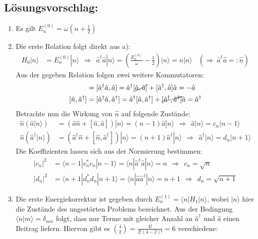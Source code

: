 \documentclass[a4paper,12pt]{article}
\newcommand{\brak}{}
\newcommand{\braket}{}
\newcommand{\kla}{}
\newcommand{\Ket}{}
\begin{document}
\subsection*{Lösungsvorschlag:}
\begin{enumerate}
\item[a)] Es gilt $E_n^{(0)}=\omega\kla\left( {n+\frac{1}{2}} \right)$
\item[b)] Die erste Relation folgt direkt aus a):
\begin{align*}
H_0\Ket | {n} \rangle&=E_n^{(0)}\Ket | {n} \rangle\ \ \Rightarrow\ \ \hat{a}^\dagger\hat{a}\Ket | {n} \rangle=\kla\left( {\frac{E_n^{(0)}}{\omega}-\frac{1}{2}} \right)\Ket | {n} \rangle=n\Ket | {n} \rangle\ \ \ \ \kla\left( {\Rightarrow\ \hat{a}^\dagger\hat{a}=:\hat{n}} \right)
\end{align*}
Aus der gegeben Relation folgen zwei weitere Kommutatoren:
\begin{align*}
[\hat{n},\hat{a}]&=[\hat{a}^\dagger\hat{a},\hat{a}]=\hat{a}^\dagger [\cancel{\hat{a},\hat{a}]}+[\hat{a}^\dagger,\hat{a}]\hat{a}=-\hat{a}\\
[\hat{n},\hat{a}^\dagger]&=[\hat{a}^\dagger\hat{a},\hat{a}^\dagger]=\hat{a}^\dagger[\hat{a},\hat{a}^\dagger]+\cancel{[\hat{a}^\dagger,\hat{a}^\dagger]}\hat{a}=\hat{a}^\dagger
\end{align*}
Betrachte nun die Wirkung von $\hat{n}$ auf folgende Zustände:
\begin{align*}
\hat{n}\kla\left( {\hat{a}\Ket | {n} \rangle} \right)&=\kla\left( {\hat{a}\hat{n}+[\hat{n},\hat{a}]} \right)\Ket | {n} \rangle=(n-1)\hat{a}\Ket | {n} \rangle\ \ \Rightarrow\ \ \hat{a}\Ket | {n} \rangle=c_n\Ket | {n-1} \rangle\\
\hat{n}\kla\left( {\hat{a}^\dagger\Ket | {n} \rangle} \right)&=\kla\left( {\hat{a}^\dagger\hat{n}+[\hat{n},\hat{a}^\dagger]} \right)\Ket | {n} \rangle=(n+1)\hat{a}^\dagger\Ket | {n} \rangle\ \ \Rightarrow\ \ \hat{a}^\dagger\Ket | {n} \rangle=d_n\Ket | {n+1} \rangle
\end{align*}
Die Koeffizienten lassen sich aus der Normierung bestimmen:
\begin{align*}
|c_n|^2&=\brak\langle {n-1}| {c_n^\ast c_n}|n-1\rangle=\braket\langle {n} | {\hat{a}^\dagger\hat{a}} | {n}\rangle=n\ \ \Rightarrow\ \ c_n=\sqrt{n}\\
|d_n|^2&=\brak\langle {n+1}| {d_n^\ast d_n}|n+1\rangle=\braket\langle {n} | {\hat{a}\hat{a}^\dagger} | {n}\rangle=n+1\ \ \Rightarrow\ \ d_n=\sqrt{n+1}
\end{align*}
\item[c)] Die erste Energiekorrektur ist gegeben durch $E_n^{(1)}=\braket\langle {n} | {H_1} | {n}\rangle$, wobei $\Ket | {n} \rangle$ hier die Zustände des ungestörten Problems bezeichnet. Aus der Bedingung $\brak\langle {n}| {m}\rangle=\delta_{nm}$ folgt, dass nur Terme mit gleicher Anzahl an $\hat{a}^\dagger$ und $\hat{a}$ einen Beitrag liefern. Hiervon gibt es $\binom{4}{2}=\frac{4!}{2!(4-2)!}=6$ verschiedene:

\end{enumerate}
\end{document}
